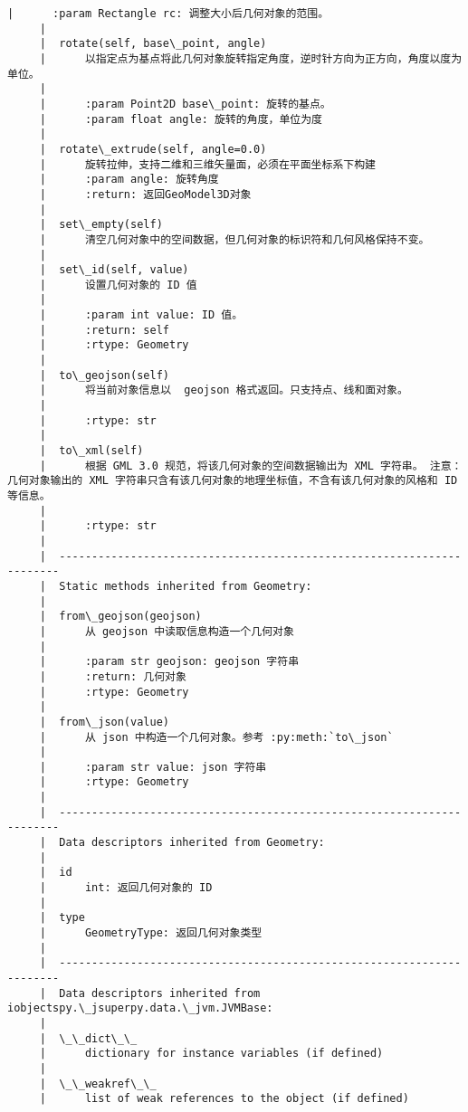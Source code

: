 \documentclass[11pt]{article}
\begin{document}
\begin{Verbatim}[commandchars=\\\{\}]
     |      :param Rectangle rc: 调整大小后几何对象的范围。
     |  
     |  rotate(self, base\_point, angle)
     |      以指定点为基点将此几何对象旋转指定角度，逆时针方向为正方向，角度以度为单位。
     |      
     |      :param Point2D base\_point: 旋转的基点。
     |      :param float angle: 旋转的角度，单位为度
     |  
     |  rotate\_extrude(self, angle=0.0)
     |      旋转拉伸，支持二维和三维矢量面，必须在平面坐标系下构建
     |      :param angle: 旋转角度
     |      :return: 返回GeoModel3D对象
     |  
     |  set\_empty(self)
     |      清空几何对象中的空间数据，但几何对象的标识符和几何风格保持不变。
     |  
     |  set\_id(self, value)
     |      设置几何对象的 ID 值
     |      
     |      :param int value: ID 值。
     |      :return: self
     |      :rtype: Geometry
     |  
     |  to\_geojson(self)
     |      将当前对象信息以  geojson 格式返回。只支持点、线和面对象。
     |      
     |      :rtype: str
     |  
     |  to\_xml(self)
     |      根据 GML 3.0 规范，将该几何对象的空间数据输出为 XML 字符串。 注意：几何对象输出的 XML 字符串只含有该几何对象的地理坐标值，不含有该几何对象的风格和 ID 等信息。
     |      
     |      :rtype: str
     |  
     |  ----------------------------------------------------------------------
     |  Static methods inherited from Geometry:
     |  
     |  from\_geojson(geojson)
     |      从 geojson 中读取信息构造一个几何对象
     |      
     |      :param str geojson: geojson 字符串
     |      :return: 几何对象
     |      :rtype: Geometry
     |  
     |  from\_json(value)
     |      从 json 中构造一个几何对象。参考 :py:meth:`to\_json`
     |      
     |      :param str value: json 字符串
     |      :rtype: Geometry
     |  
     |  ----------------------------------------------------------------------
     |  Data descriptors inherited from Geometry:
     |  
     |  id
     |      int: 返回几何对象的 ID
     |  
     |  type
     |      GeometryType: 返回几何对象类型
     |  
     |  ----------------------------------------------------------------------
     |  Data descriptors inherited from iobjectspy.\_jsuperpy.data.\_jvm.JVMBase:
     |  
     |  \_\_dict\_\_
     |      dictionary for instance variables (if defined)
     |  
     |  \_\_weakref\_\_
     |      list of weak references to the object (if defined)
    

\end{Verbatim}
\end{document}
